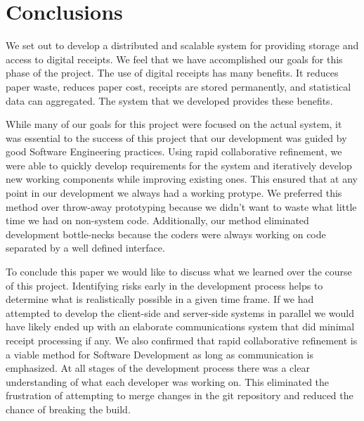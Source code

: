 \section{Conclusions}
\label{sec:conclusion}
We set out to develop a distributed and scalable system for providing storage and access to digital receipts.  We feel that we have accomplished our goals for this phase of the project.  The use of digital receipts has many benefits.  It reduces paper waste, reduces paper cost, receipts are stored permanently, and statistical data can aggregated.  The system that we developed provides these benefits.

While many of our goals for this project were focused on the actual system, it was essential to the success of this project that our development was guided by good Software Engineering practices.  Using rapid collaborative refinement, we were able to quickly develop requirements for the system and iteratively develop new working components while improving existing ones.  This ensured that at any point in our development we always had a working protype.  We preferred this method over throw-away prototyping because we didn't want to waste what little time we had on non-system code.  Additionally, our method eliminated development bottle-necks because the coders were always working on code separated by a well defined interface.

To conclude this paper we would like to discuss what we learned over the course of this project.  Identifying risks early in the development process helps to determine what is realistically possible in a given time frame.  If we had attempted to develop the client-side and server-side systems in parallel we would have likely ended up with an elaborate communications system that did minimal receipt processing if any.  We also confirmed that rapid collaborative refinement is a viable method for Software Development as long as communication is emphasized.  At all stages of the development process there was a clear understanding of what each developer was working on.  This eliminated the frustration of attempting to merge changes in the git repository and reduced the chance of breaking the build.


